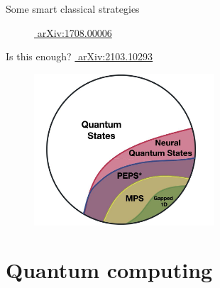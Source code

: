 \documentclass[aspectratio=169, 10pt, xcolor={svgnames}, hyperref={linkcolor=black}]{beamer}
\begin{document}
\begin{frame}{Some smart classical strategies}
\begin{multicols}{3}
\begin{figure}
{      \caption*{\href{https://arxiv.org/abs/1708.00006}{\faBook\,\,arXiv:1708.00006}}}%
   \end{figure}
   \end{multicols}
\end{frame}

\begin{frame}{Is this enough? \hfill \href{https://arxiv.org/abs/2103.10293}{\faBook\,\,arXiv:2103.10293}}
\pause
\begin{figure}
   \includegraphics[width=0.6\textwidth]{figures/complexity.jpg}
\end{figure}
\end{frame}

\section{Quantum computing}
\end{document}
